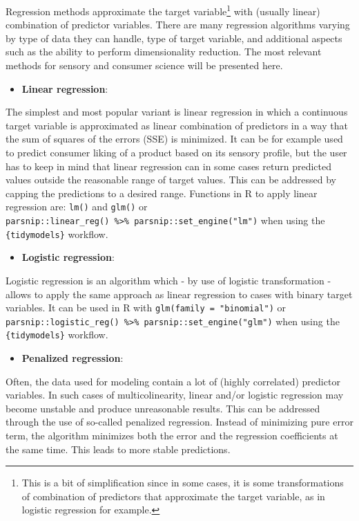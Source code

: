 \documentclass[
]{krantz}
\providecommand{\tightlist}{%
  \setlength{\itemsep}{0pt}\setlength{\parskip}{0pt}}
\begin{document}
Regression methods approximate the target variable\footnote{This is a bit of simplification since in some cases, it is some transformations of combination of predictors that approximate the target variable, as in logistic regression for example.} with (usually linear) combination of predictor variables. There are many regression algorithms varying by type of data they can handle, type of target variable, and additional aspects such as the ability to perform dimensionality reduction. The most relevant methods for sensory and consumer science will be presented here.

\begin{itemize}
\tightlist
\item
  \textbf{Linear regression}:
\end{itemize}

The simplest and most popular variant is linear regression in which a continuous target variable is approximated as linear combination of predictors in a way that the sum of squares of the errors (SSE) is minimized. It can be for example used to predict consumer liking of a product based on its sensory profile, but the user has to keep in mind that linear regression can in some cases return predicted values outside the reasonable range of target values. This can be addressed by capping the predictions to a desired range. Functions in R to apply linear regression are: \texttt{lm()} and \texttt{glm()} or \texttt{parsnip::linear\_reg()\ \%\textgreater{}\%\ parsnip::set\_engine("lm")} when using the \texttt{\{tidymodels\}} workflow.

\begin{itemize}
\tightlist
\item
  \textbf{Logistic regression}:
\end{itemize}

Logistic regression is an algorithm which - by use of logistic transformation - allows to apply the same approach as linear regression to cases with binary target variables. It can be used in R with \texttt{glm(family\ =\ "binomial")} or \texttt{parsnip::logistic\_reg()\ \%\textgreater{}\%\ parsnip::set\_engine("glm")} when using the \texttt{\{tidymodels\}} workflow.

\begin{itemize}
\tightlist
\item
  \textbf{Penalized regression}:
\end{itemize}

Often, the data used for modeling contain a lot of (highly correlated) predictor variables. In such cases of multicolinearity, linear and/or logistic regression may become unstable and produce unreasonable results. This can be addressed through the use of so-called penalized regression. Instead of minimizing pure error term, the algorithm minimizes both the error and the regression coefficients at the same time. This leads to more stable predictions.
\end{document}
